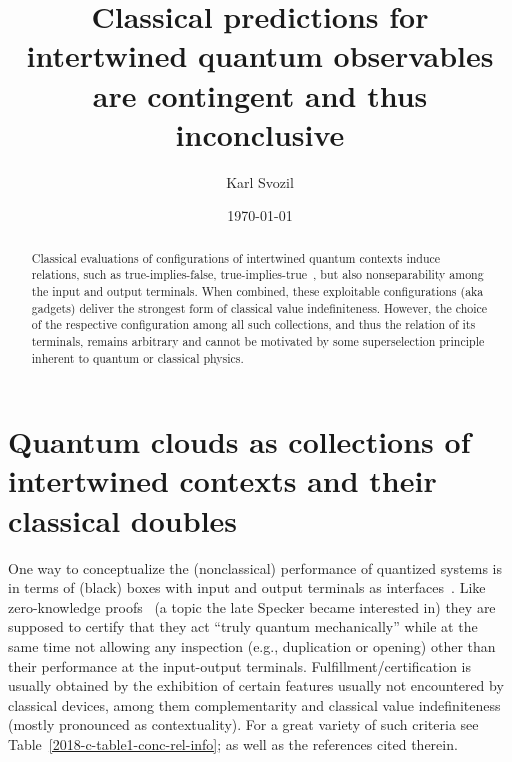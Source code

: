 \documentclass[%
  reprint,
  twocolumn,
 showpacs,
 showkeys,
 preprintnumbers,
 amsmath,amssymb,
 aps,
  prl,
  longbibliography,
 ]{revtex4-1}
\begin{document}
\title{Classical predictions for intertwined quantum observables are contingent and thus inconclusive}


\author{Karl Svozil}




\date{\today}

\begin{abstract}
Classical evaluations of configurations of intertwined quantum contexts induce relations, such as true-implies-false, true-implies-true~\cite{2018-minimalYIYS}, but also nonseparability among the input and output terminals. When combined, these exploitable configurations (aka gadgets) deliver the strongest form of classical value indefiniteness. However, the choice of the respective configuration among all such collections, and thus the relation of its terminals, remains arbitrary and cannot be motivated by some superselection principle inherent to quantum or classical physics.
\end{abstract}


\maketitle

\section{Quantum clouds as collections of intertwined contexts and their classical doubles}

One way to conceptualize the (nonclassical) performance of quantized systems is in terms of (black) boxes
with input and output terminals as interfaces~\cite{2018-minimalYIYS}.
Like zero-knowledge proofs~\cite{Quisquater1990} (a topic the late Specker became interested in)
they are supposed to certify that they act ``truly quantum mechanically''
while at the same time not allowing any inspection (e.g., duplication or opening)
other than their performance at the input-output
terminals.
Fulfillment/certification is usually obtained by the exhibition of certain features usually not encountered by classical devices, among them complementarity
and classical value indefiniteness (mostly pronounced as contextuality).
For a great variety of such criteria see Table~\ref{2018-c-table1-conc-rel-info};
as well as the references cited therein.
\end{document}
